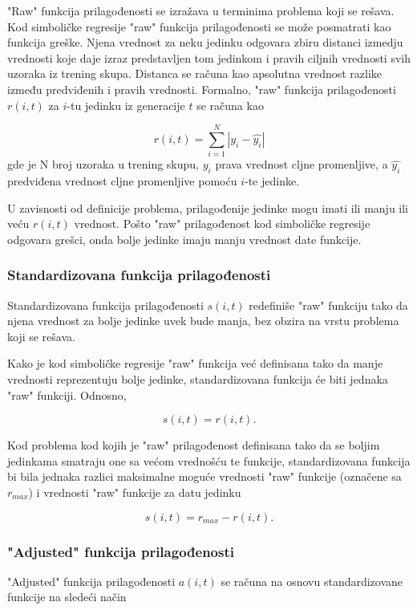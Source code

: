 \documentclass[main.tex]{subfiles}
\begin{document}
"Raw" funkcija prilagođenosti se izražava u terminima problema koji se rešava. Kod simboličke regresije "raw" funkcija prilagođenosti se može posmatrati kao funkcija greške. Njena vrednost za neku jedinku odgovara zbiru distanci izmedju vrednosti koje daje izraz predstavljen tom jedinkom i pravih ciljnih vrednosti svih uzoraka iz trening skupa. Distanca se računa kao apsolutna vrednost razlike između predviđenih i pravih vrednosti. Formalno, "raw" funkcija prilagođenosti $r(i,t)$ za $i$-tu jedinku iz generacije $t$ se računa kao

\[ r(i,t) = \sum_{i=1}^{N}|y_i - \hat{y_i}|  \]
gde je N broj uzoraka u trening skupu, $y_i$ prava vrednost cljne promenljive, a $\hat{y_i}$ predviđena vrednost cljne promenljive pomoću $i$-te jedinke.

U zavisnosti od definicije problema, prilagođenije jedinke mogu imati ili manju ili veću $r(i,t)$ vrednost.
Pošto "raw" prilagođenost kod simboličke regresije odgovara grešci, onda bolje jedinke imaju manju vrednost date funkcije.


\subsubsection{Standardizovana funkcija prilagođenosti}
\label{sec:rawFitness}

Standardizovana funkcija prilagođenosti $s(i,t)$ redefiniše "raw" funkciju tako da njena vrednost za bolje jedinke uvek bude manja, bez obzira na vrstu problema koji se rešava. 

Kako je kod simboličke regresije "raw" funkcija već definisana tako da manje vrednosti reprezentuju bolje jedinke, standardizovana funkcija će biti jednaka "raw" funkciji. Odnosno,

\[ s(i,t) = r(i,t). \]

Kod problema kod kojih je "raw" prilagođenost definisana tako da se boljim jedinkama smatraju one sa većom vrednošću te funkcije, standardizovana funkcija bi bila jednaka razlici maksimalne moguće vrednosti "raw" funkcije (označene sa $r_{max}$) i vrednosti "raw" funkcije za datu jedinku

\[ s(i,t) = r_{max} - r(i,t). \]


\subsubsection{"Adjusted" funkcija prilagođenosti}
\label{sec:adjustedFitness}

"Adjusted" funkcija prilagođenosti $a(i,t)$ se računa na osnovu standardizovane funkcije na sledeći način
\end{document}
